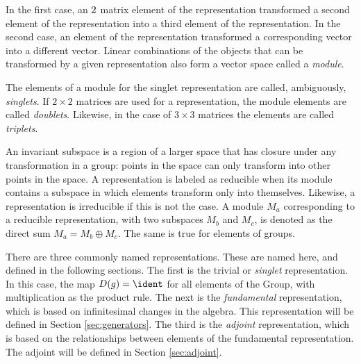 In the first case, an $2\time2$ matrix element of the representation transformed a second element of the representation into a third element of the representation.
In the second case, an element of the representation transformed a corresponding vector into a different vector.
Linear combinations of the objects that can be transformed by a given representation also form a vector space called a \emph{module}.

The elements of a module for the singlet representation are called, ambiguously, \emph{singlets}. \check
If $2\times2$ matrices are used for a representation, the module elements are called \emph{doublets}. Likewise, in the case of $3\times3$ matrices the elements are called \emph{triplets}.

An invariant subspace is a region of a larger space that has closure under any transformation in a group: points in the space can only transform into other points in the space.
A representation is labeled as reducible when its module contains a subspace in which elements transform only into themselves.
Likewise, a representation is irreducible if this is not the case. 
A module $M_a$ corresponding to a reducible representation, with two subspaces $M_b$ and $M_c$, is denoted as the direct sum $M_a=M_b\oplus M_c$. The same is true for elements of groups.


There are three commonly named representations.
These are named here, and defined in the following sections.
%
The first is the trivial or \emph{singlet} representation.
In this case, the map $D(g)=\ident$ for all elements of the Group, with multiplication as the product rule.
The next is the \emph{fundamental} representation, which is based on infinitesimal changes in the algebra.
This representation will be defined in Section \ref{sec:generators}.
The third is the \emph{adjoint} representation, which is based on the relationships between elements of the fundamental representation.
The adjoint will be defined in Section \ref{sec:adjoint}.




